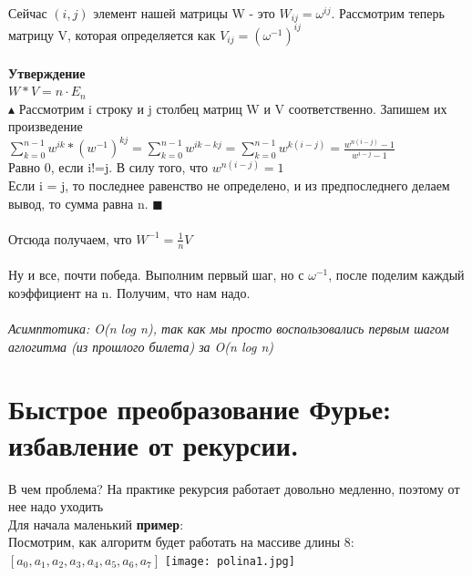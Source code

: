 Сейчас  $(i,j)$ элемент нашей матрицы W - это $W_{ij} = \omega^{ij}$. Рассмотрим теперь матрицу V, которая определяется как $V_{ij} = (\omega^{-1})^{ij}$
 \\
 \\
 \textbf{Утверждение}
 \\
$W*V = n\cdot E_n$ \\
$\blacktriangle$
Рассмотрим i строку и j столбец матриц W и V соответственно.  Запишем их произведение \\ $\sum \limits_{k = 0}^{n - 1}w^{ik}*(w^{-1})^{kj} = \sum \limits_{k = 0}^{n - 1}w^{ik-kj} = \sum \limits_{k = 0}^{n - 1}w^{k(i-j)} = \frac{w^{n(i-j)} - 1}{w^{i-j} - 1}$
\\
Равно 0, если i!=j. В силу того, что $w^{n(i-j)} = 1$
\\
Если i = j, то последнее равенство не определено, и из предпоследнего делаем вывод, то сумма равна n. 
$\blacksquare$ \\ \\
Отсюда получаем, что $W^{-1} = \frac{1}{n}V$
\\
\\
Ну и все, почти победа. Выполним первый шаг, но с $\omega^{-1}$, после поделим каждый коэффициент на n. Получим, что нам надо.
\\
\\
\textit{Асимптотика: O(n log n), так как мы просто воспользовались первым шагом аглогитма (из прошлого билета) за O(n log n)}
\newpage{}

\section{Быстрое преобразование Фурье: избавление от рекурсии.}
В чем проблема? На практике рекурсия работает довольно медленно, поэтому от нее надо уходить
\\
Для начала маленький \textbf{пример}: \\
Посмотрим, как алгоритм будет работать на массиве длины 8: $[a_0, a_1, a_2, a_3, a_4, a_5, a_6, a_7]$
\texttt{[image: polina1.jpg]}

